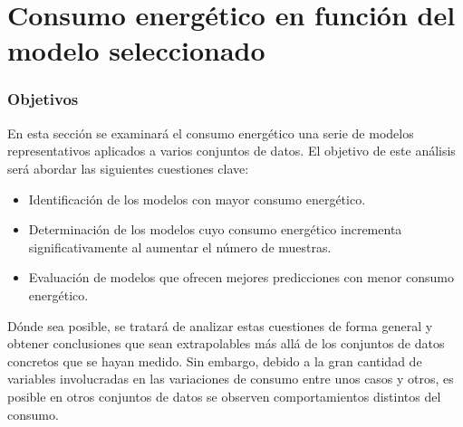 \section{Consumo energético en función del modelo seleccionado}
\label{sec:test-1-models}

    

\subsubsection{Objetivos}

En esta sección se examinará el consumo energético una serie de modelos representativos aplicados a varios conjuntos de datos. El objetivo de este análisis será abordar las siguientes cuestiones clave:

\begin{itemize}
    \item Identificación de los modelos con mayor consumo energético.
    \item Determinación de los modelos cuyo consumo energético incrementa significativamente al aumentar el número de muestras.
    \item Evaluación de modelos que ofrecen mejores predicciones con menor consumo energético.
\end{itemize}

Dónde sea posible, se tratará de analizar estas cuestiones de forma general y obtener conclusiones que sean extrapolables más allá de los conjuntos de datos concretos que se hayan medido. Sin embargo, debido a la gran cantidad de variables involucradas en las variaciones de consumo entre unos casos y otros, es posible en otros conjuntos de datos se observen comportamientos distintos del consumo.

